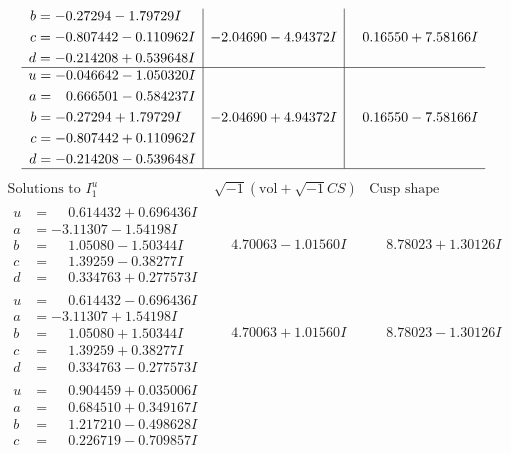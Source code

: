 \documentclass[1p]{elsarticle_modified}
\theoremstyle{definition}
\newcommand{\I}{\sqrt{-1}}
\begin{document}
$$\begin{array}{c|c|c}
\begin{aligned}
b &= -0.27294 - 1.79729 I \\
c &= -0.807442 - 0.110962 I \\
d &= -0.214208 + 0.539648 I\end{aligned}
 & -2.04690 - 4.94372 I & \phantom{-}0.16550 + 7.58166 I \\ \hline\begin{aligned}
u &= -0.046642 - 1.050320 I \\
a &= \phantom{-}0.666501 - 0.584237 I \\
b &= -0.27294 + 1.79729 I \\
c &= -0.807442 + 0.110962 I \\
d &= -0.214208 - 0.539648 I\end{aligned}
 & -2.04690 + 4.94372 I & \phantom{-}0.16550 - 7.58166 I\\
 \hline 
 \end{array}$$\newpage$$\begin{array}{c|c|c}  
\text{Solutions to }I^u_{1}& \I (\text{vol} + \sqrt{-1}CS) & \text{Cusp shape}\\
 \hline 
\begin{aligned}
u &= \phantom{-}0.614432 + 0.696436 I \\
a &= -3.11307 - 1.54198 I \\
b &= \phantom{-}1.05080 - 1.50344 I \\
c &= \phantom{-}1.39259 - 0.38277 I \\
d &= \phantom{-}0.334763 + 0.277573 I\end{aligned}
 & \phantom{-}4.70063 - 1.01560 I & \phantom{-}8.78023 + 1.30126 I \\ \hline\begin{aligned}
u &= \phantom{-}0.614432 - 0.696436 I \\
a &= -3.11307 + 1.54198 I \\
b &= \phantom{-}1.05080 + 1.50344 I \\
c &= \phantom{-}1.39259 + 0.38277 I \\
d &= \phantom{-}0.334763 - 0.277573 I\end{aligned}
 & \phantom{-}4.70063 + 1.01560 I & \phantom{-}8.78023 - 1.30126 I \\ \hline\begin{aligned}
u &= \phantom{-}0.904459 + 0.035006 I \\
a &= \phantom{-}0.684510 + 0.349167 I \\
b &= \phantom{-}1.217210 - 0.498628 I \\
c &= \phantom{-}0.226719 - 0.709857 I \\

\end{aligned}
\end{array}$$
\end{document}
